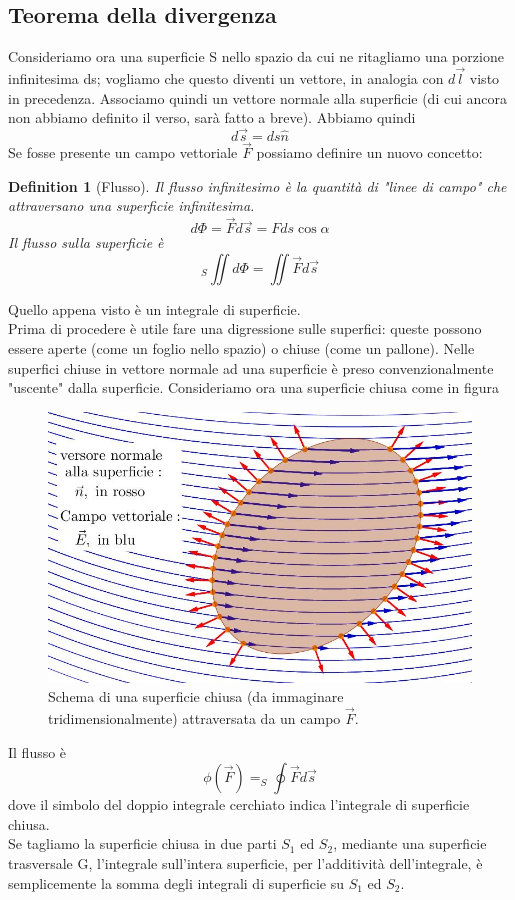 \documentclass[10pt,a4paper]{article}
\newtheorem{definition}{Definition}
\begin{document}
\subsection{Teorema della divergenza}\label{ap:thm_divergenza}
Consideriamo ora una superficie S nello spazio da cui ne ritagliamo una porzione infinitesima ds; vogliamo che questo diventi un vettore, in analogia con $d\vec{l}$ visto in precedenza. Associamo quindi un vettore normale alla superficie (di cui ancora non abbiamo definito il verso, sarà fatto a breve). Abbiamo quindi
\[d\vec{s} = ds \hat{n}\]
Se fosse presente un campo vettoriale $\vec{F}$ possiamo definire un nuovo concetto:
\begin{definition}[Flusso]
	Il flusso infinitesimo è la quantità di "linee di campo" che attraversano una superficie infinitesima. 
	\[d\Phi = \vec{F}d\vec{s} = Fds\cos\alpha\]
	Il flusso sulla superficie è 
	\[_S\iint d\Phi = \iint \vec{F}d\vec{s}\]
\end{definition}
Quello appena visto è un integrale di superficie.\\
Prima di procedere è utile fare una digressione sulle superfici: queste possono essere aperte (come un foglio nello spazio) o chiuse (come un pallone). Nelle superfici chiuse in vettore normale ad una superficie è preso convenzionalmente "uscente" dalla superficie. Consideriamo ora una superficie chiusa come in figura
\begin{figure}[h!]
	\centering
	\includegraphics[width=0.6\linewidth]{images/flusso2bis}
	\caption{Schema di una superficie chiusa (da immaginare tridimensionalmente) attraversata da un campo \(\vec{F}\).}
	\label{fig:flusso2bis}
\end{figure}
\FloatBarrier
Il flusso è 
\[\phi(\vec{F}) = _S\oint \vec{F}d\vec{s}\]
dove il simbolo del doppio integrale cerchiato indica l'integrale di superficie chiusa.\\
Se tagliamo la superficie chiusa in due parti \(S_1\) ed \(S_2\), mediante una superficie trasversale G, l'integrale sull'intera superficie, per l'additività dell'integrale, è semplicemente la somma degli integrali di superficie su \(S_1\) ed \(S_2\).
\end{document}
